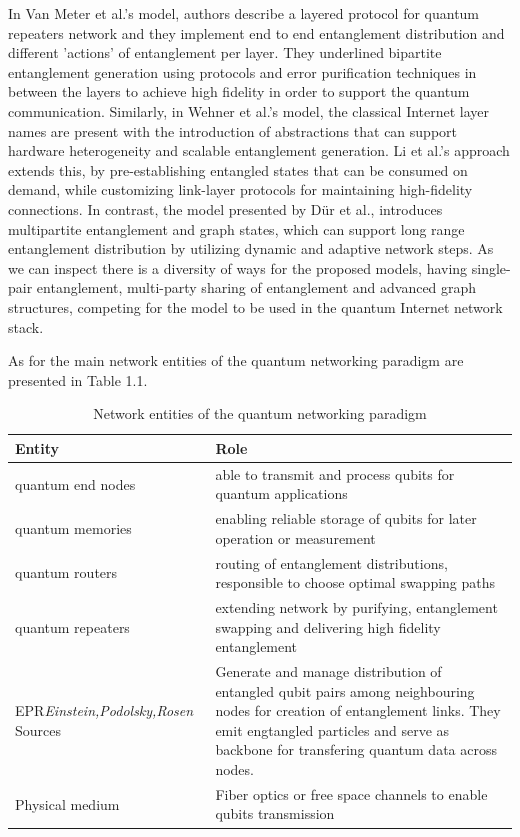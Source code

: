 \documentclass[12pt,a4paper] {report}
\begin{document}
		In Van Meter et al.'s model, authors describe a layered protocol for quantum repeaters network and
		they implement end to end entanglement distribution and different 'actions' of entanglement per layer.
		They underlined bipartite entanglement generation using protocols and error purification techniques in between the
		layers to achieve  high fidelity in order to support the quantum communication.
		Similarly, in Wehner et al.'s model, the classical Internet layer names are present with the introduction
		of abstractions that can support hardware heterogeneity and scalable entanglement generation. 
		Li et al.'s approach extends this, by pre-establishing entangled states that can be consumed on demand, 
		while customizing link-layer protocols for maintaining high-fidelity connections. 
		In contrast, the model presented by Dür et al., introduces multipartite entanglement and graph states, 
		which can support long range entanglement distribution by utilizing dynamic and adaptive network steps. 
		As we can inspect there is a diversity of ways for the proposed models, having single-pair entanglement, 
		multi-party sharing of entanglement and advanced graph structures, competing for the model to be used
		in the quantum Internet network stack.

		As for the main network entities of the quantum networking paradigm\cite{e-qnet} are presented in Table 1.1.

		\begin{table}[h!]
		\centering
		\renewcommand{\arraystretch}{1.5}
			\begin{tabular}{|p{5.5cm}|p{10cm}|}
			\hline
			\textbf{Entity} & \textbf{Role} \\ \hline
			quantum end nodes	&  able to transmit and process qubits for quantum applications		\\ \hline
			quantum memories	&  enabling reliable storage of qubits for later operation or measurement 		\\ \hline
			quantum routers		&  routing of entanglement distributions, responsible to choose optimal swapping paths 		\\ \hline
			quantum repeaters	& extending network by purifying, entanglement swapping and delivering high fidelity entanglement 		\\ \hline
				EPR\textit{Einstein,Podolsky,Rosen} Sources		&  Generate and manage distribution of entangled qubit pairs among neighbouring nodes for creation of entanglement links. They emit engtangled particles and serve as backbone for transfering quantum data across nodes.		\\ \hline
			Physical medium		&  Fiber optics or free space channels to enable qubits transmission		\\ \hline
		\end{tabular}
		\caption{Network entities of the quantum networking paradigm}
		\label{tab:example}
		\end{table}
\end{document}
